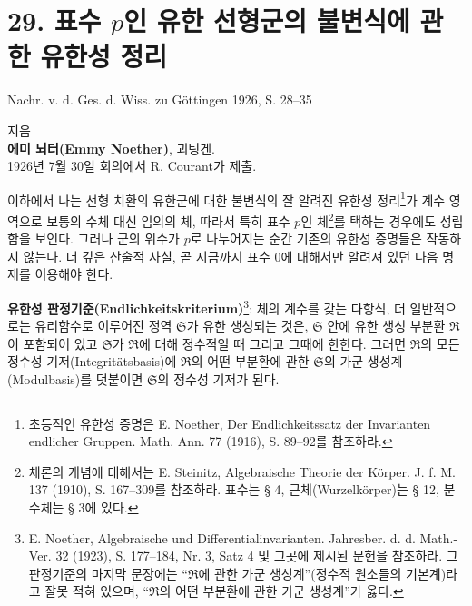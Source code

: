 
\section*{29. 표수 $p$인 유한 선형군의 불변식에 관한 유한성 정리}

\begin{center}
Nachr. v. d. Ges. d. Wiss. zu Göttingen 1926, S. 28--35
\end{center}

\setcounter{footnote}{0}

\begin{center}
지음\\[0.5em]
\textbf{에미 뇌터(Emmy Noether)}, 괴팅겐.\\[1em]
1926년 7월 30일 회의에서 R. Courant가 제출.
\end{center}

이하에서 나는 선형 치환의 유한군에 대한 불변식의 잘 알려진 유한성 정리\footnote{초등적인 유한성 증명은 E. Noether, Der Endlichkeitssatz der Invarianten endlicher Gruppen. Math. Ann. 77 (1916), S. 89--92를 참조하라.}가 계수 영역으로 보통의 수체 대신 임의의 체, 따라서 특히 표수 $p$인 체\footnote{체론의 개념에 대해서는 E. Steinitz, Algebraische Theorie der Körper. J. f. M. 137 (1910), S. 167--309를 참조하라. 표수는 § 4, 근체(Wurzelkörper)는 § 12, 분수체는 § 3에 있다.}를 택하는 경우에도 성립함을 보인다. 그러나 군의 위수가 $p$로 나누어지는 순간 기존의 유한성 증명들은 작동하지 않는다. 더 깊은 산술적 사실, 곧 지금까지 표수 0에 대해서만 알려져 있던 다음 명제를 이용해야 한다.

\textbf{유한성 판정기준(Endlichkeitskriterium)}\footnote{E. Noether, Algebraische und Differentialinvarianten. Jahresber. d. d. Math.-Ver. 32 (1923), S. 177--184, Nr. 3, Satz 4 및 그곳에 제시된 문헌을 참조하라. 그 판정기준의 마지막 문장에는 ``$\mathfrak R$에 관한 가군 생성계''(정수적 원소들의 기본계)라고 잘못 적혀 있으며, ``$\mathfrak R$의 어떤 부분환에 관한 가군 생성계''가 옳다.}: 체의 계수를 갖는 다항식, 더 일반적으로는 유리함수로 이루어진 정역 $\mathfrak S$가 유한 생성되는 것은, $\mathfrak S$ 안에 유한 생성 부분환 $\mathfrak R$이 포함되어 있고 $\mathfrak S$가 $\mathfrak R$에 대해 정수적일 때 그리고 그때에 한한다. 그러면 $\mathfrak R$의 모든 정수성 기저(Integritätsbasis)에 $\mathfrak R$의 어떤 부분환에 관한 $\mathfrak S$의 가군 생성계(Modulbasis)를 덧붙이면 $\mathfrak S$의 정수성 기저가 된다.

